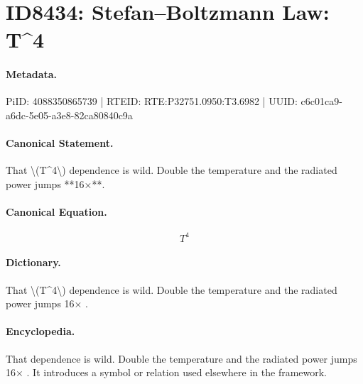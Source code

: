 \section*{ID8434: Stefan–Boltzmann Law: T\textasciicircum{}4}
\paragraph{Metadata.}
PiID: 4088350865739 | RTEID: RTE:P32751.0950:T3.6982 | UUID: c6c01ca9-a6dc-5e05-a3e8-82ca80840c9a

\paragraph{Canonical Statement.}
That \textbackslash{}(T\textasciicircum{}4\textbackslash{}) dependence is wild. Double the temperature and the radiated power jumps **16×**.

\paragraph{Canonical Equation.}
\[
T^4
\]

\paragraph{Dictionary.}
That \textbackslash{}(T\textasciicircum{}4\textbackslash{}) dependence is wild. Double the temperature and the radiated power jumps 16× .

\paragraph{Encyclopedia.}
That dependence is wild. Double the temperature and the radiated power jumps 16× . It introduces a symbol or relation used elsewhere in the framework.
